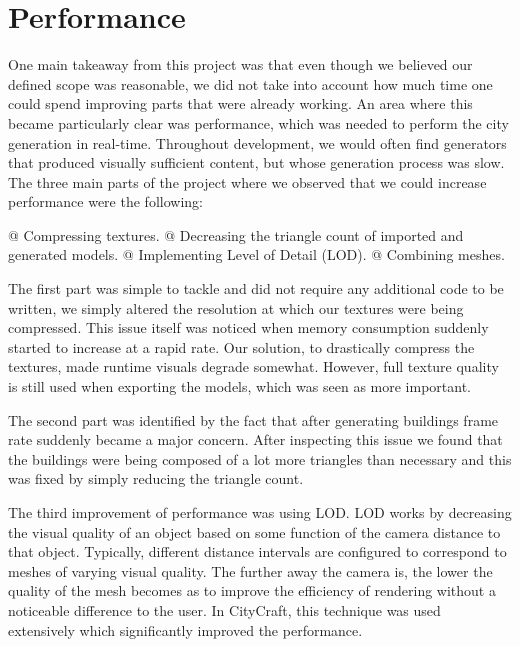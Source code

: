\section{Performance}

One main takeaway from this project was that even though we believed our defined scope was reasonable, we did not take into account how much time one could spend improving parts that were already working.
An area where this became particularly clear was performance, which was needed to perform the city generation in real-time.
Throughout development, we would often find generators that produced visually sufficient content, but whose generation process was slow. 
The three main parts of the project where we observed that we could increase performance were the following:

\begin{easylist}
  @ Compressing textures.
  @ Decreasing the triangle count of imported and generated models.
  @ Implementing Level of Detail (LOD).
  @ Combining meshes. 
\end{easylist}
 
The first part was simple to tackle and did not require any additional code to be written, we simply altered the resolution at which our textures were being compressed.
This issue itself was noticed when memory consumption suddenly started to increase at a rapid rate.
Our solution, to drastically compress the textures, made runtime visuals degrade somewhat.
However, full texture quality is still used when exporting the models, which was seen as more important.

The second part was identified by the fact that after generating buildings frame rate suddenly became a major concern. 
After inspecting this issue we found that the buildings were being composed of a lot more triangles than necessary and this was fixed by simply reducing the triangle count. 

\newpage
The third improvement of performance was using LOD.
LOD works by decreasing the visual quality of an object based on some function of the camera distance to that object.
Typically, different distance intervals are configured to correspond to meshes of varying visual quality.
The further away the camera is, the lower the quality of the mesh becomes as to improve the efficiency of rendering without a noticeable difference to the user.
In CityCraft, this technique was used extensively which significantly improved the performance.

